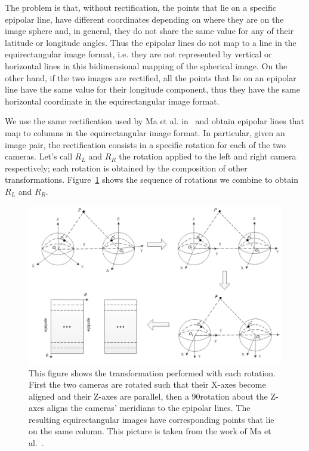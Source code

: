 The problem is that, without rectification, the points that lie on a specific
epipolar line, have different coordinates depending on where they are on the
image sphere and, in general, they do not share the same value for any of their 
latitude or longitude angles. Thus the epipolar lines do not map to a line in
the equirectangular image format, i.e. they are not represented by vertical or 
horizontal lines in this bidimensional mapping of the spherical image.
On the other hand, if the two images are rectified, all the points that lie
on an epipolar line have the same value for their longitude component, thus
they have the same horizontal coordinate in the equirectangular image format.

We use the same rectification used by Ma et al. in~\cite{ma20153d} and obtain
epipolar lines that map to columns in the equirectangular image format.
In particular, given an image pair, the rectification consists in a specific
rotation for each of the two cameras. Let's call $R_L$ and $R_R$ the rotation
applied to the left and right camera respectively; each rotation is obtained
by the composition of other transformations. Figure~\ref{fig:rectification} shows
the sequence of rotations we combine to obtain $R_L$ and $R_R$.
%
\begin{figure}
\centering
\includegraphics[width=\linewidth]{img/rectification.png}
\caption{This figure shows the transformation performed with each rotation.
First the two cameras are rotated such that their X-axes become aligned and 
their Z-axes are parallel, then a 90\degree rotation about the Z-axes aligns
the cameras' meridians to the epipolar lines. The resulting equirectangular
images have corresponding points that lie on the same column.
This picture is taken from the work of Ma et al.~\cite{ma20153d}.}
\label{fig:rectification}
\end{figure}
